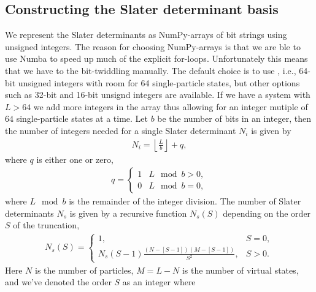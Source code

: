         \subsection{Constructing the Slater determinant basis}
            We represent the Slater determinants as NumPy-arrays \cite{numpy} of
            bit strings using unsigned integers.
            The reason for choosing NumPy-arrays is that we are ble to use Numba
            \cite{numba} to speed up much of the explicit for-loops.
            Unfortunately this means that we have to the bit-twiddling manually.
            The default choice is to use , i.e., 64-bit unsigned
            integers with room for 64 single-particle states, but other options
            such as 32-bit and 16-bit unsignd integers are available.
            If we have a system with $L > 64$ we add more integers in the array
            thus allowing for an integer mutiple of $64$ single-particle states at
            a time.
            Let $b$ be the number of bits in an integer, then the number of
            integers needed for a single Slater determinant $N_i$ is given by
            \begin{align}
                N_i = \left\lfloor\frac{L}{b}\right\rfloor
                + q,
            \end{align}
            where $q$ is either one or zero,
            \begin{align}
                q = \begin{cases}
                    1 & L \mod b > 0, \\
                    0 & L \mod b = 0,
                \end{cases}
            \end{align}
            where $L \mod b$ is the remainder of the integer division.
            The number of Slater determinants $N_s$ is given by a recursive
            function $N_s(S)$ depending on the order $S$ of the truncation,
            \begin{align}
                N_s(S) = \begin{cases}
                    1, & S = 0, \\
                    N_s(S - 1) \frac{(N - [S - 1])(M - [S - 1])}{S^2}, & S > 0.
                \end{cases}
            \end{align}
            Here $N$ is the number of particles, $M = L - N$ is the number of
            virtual states, and we've denoted the order $S$ as an integer where
